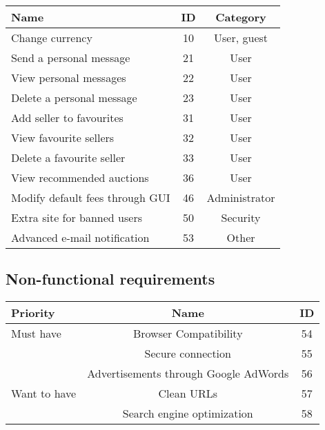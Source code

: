 	\begin{tabular}{l|c c}
	  Name & ID & Category \\ 
	  \hline
	  Change currency & 10 & User, guest \\
	  Send a personal message & 21 & User \\
	  View personal messages & 22 & User \\
	  Delete a personal message & 23 & User \\
	  Add seller to favourites  & 31 & User \\
	  View favourite sellers & 32 & User \\
	  Delete a favourite seller & 33 & User \\
	  View recommended auctions & 36 & User \\
	  Modify default fees through GUI & 46 & Administrator \\
	  Extra site for banned users & 50 & Security \\
	  Advanced e-mail notification & 53 & Other \\
	\end{tabular}
	
	\subsection{Non-functional requirements}
	
	\begin{tabular}{l|c c}
	  Priority & Name & ID \\ 
	  \hline
	  Must have & Browser Compatibility & 54 \\
	  & Secure connection & 55 \\
	  & Advertisements through Google AdWords & 56 \\
	  \hline
	  Want to have & Clean URLs & 57 \\
	  & Search engine optimization & 58 \\
	\end{tabular}
	
	  
	